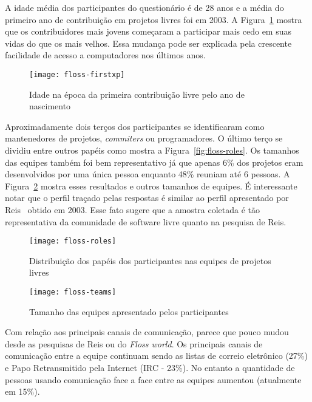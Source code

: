 A idade média dos participantes do questionário é de 28 anos e a média
do primeiro ano de contribuição em projetos livres foi em 2003. A
Figura~\ref{fig:floss-firstxp} mostra que os contribuidores mais
jovens começaram a participar mais cedo em suas vidas do que os mais
velhos. Essa mudança pode ser explicada pela crescente facilidade de
acesso a computadores nos últimos anos.


\begin{figure}
  \centering
  \texttt{[image: floss-firstxp]}
  \caption{Idade na época da primeira contribuição livre pelo ano de
    nascimento}
  \label{fig:floss-firstxp}
\end{figure}

Aproximadamente dois terços dos participantes se identificaram como
mantenedores de projetos, \textit{commiters} ou programadores. O
último terço se dividiu entre outros papéis como mostra a
Figura~\ref{fig:floss-roles}. Os tamanhos das equipes também foi bem
representativo já que apenas 6\% dos projetos eram desenvolvidos por
uma única pessoa enquanto 48\% reuniam até 6 pessoas. A
Figura~\ref{fig:floss-teams} mostra esses resultados e outros tamanhos
de equipes. É interessante notar que o perfil traçado pelas respostas
é similar ao perfil apresentado por Reis~\cite{Reis2003} obtido em
2003. Esse fato sugere que a amostra coletada é tão representativa da
comunidade de software livre quanto na pesquisa de Reis.



\begin{figure}[htb]
  \begin{minipage}[t]{0.55\linewidth}
    \centering
    \texttt{[image: floss-roles]}
    \caption{Distribuição dos papéis dos participantes nas equipes de
      projetos livres}
    \label{fig:floss-roles}
  \end{minipage}
  \begin{minipage}[t]{0.45\linewidth}
    \centering
    \texttt{[image: floss-teams]}
    \caption{Tamanho das equipes apresentado pelos participantes}
    \label{fig:floss-teams}
  \end{minipage}
\end{figure}

Com relação aos principais canais de comunicação, parece que pouco
mudou desde as pesquisas de Reis ou do \textit{Floss world}. Os
principais canais de comunicação entre a equipe continuam sendo as
listas de correio eletrônico (27\%) e Papo Retransmitido pela Internet
(IRC - 23\%). No entanto a quantidade de pessoas usando comunicação
face a face entre as equipes aumentou (atualmente em 15\%).

